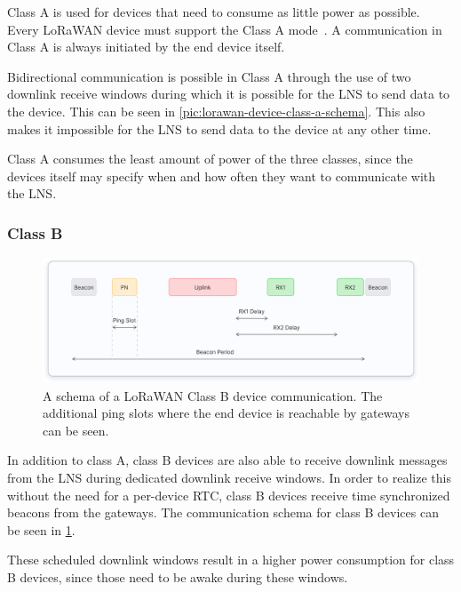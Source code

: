 Class A is used for devices that need to consume as little power as possible.
Every \ac{LoRaWAN} device must support the Class A mode~\cite[p. 11]{lora_alliance_inc_lorawan_2017}.
A communication in Class A is always initiated by the end device itself.

Bidirectional communication is possible in Class A through the use of two downlink receive windows during which it is possible for the \ac{LNS} to send data to the device.
This can be seen in \cref{pic:lorawan-device-class-a-schema}.
This also makes it impossible for the \ac{LNS} to send data to the device at any other time.

Class A consumes the least amount of power of the three classes, since the devices itself may specify when and how often they want to communicate with the \ac{LNS}.

\subsubsection{Class B}

\begin{figure}[htbp]
    \centering
    \includegraphics[width=1\textwidth]{pictures/device-classes/class-b.png}
    \caption{
        A schema of a \ac{LoRaWAN} Class B device communication.
        The additional ping slots where the end device is reachable by gateways can be seen.~\protect\cite{the_things_industries_bv_device_nodate}
    }\label{pic:lorawan-device-class-b-schema}
\end{figure}

In addition to class A, class B devices are also able to receive downlink messages from the \ac{LNS} during dedicated downlink receive windows.
In order to realize this without the need for a per-device \ac{RTC}, class B devices receive time synchronized beacons from the gateways.
The communication schema for class B devices can be seen in \cref{pic:lorawan-device-class-b-schema}.

These scheduled downlink windows result in a higher power consumption for class B devices, since those need to be awake during these windows.

